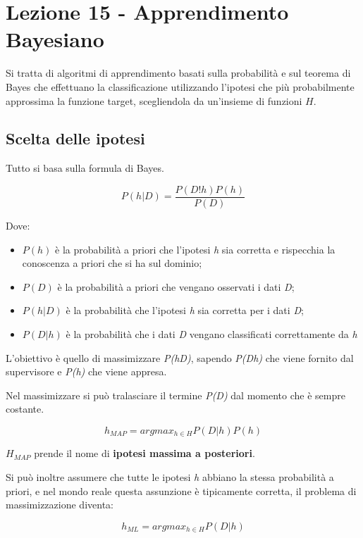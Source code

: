 \section{Lezione 15 - Apprendimento Bayesiano}\label{lezione-15---apprendimento-bayesiano}

Si tratta di algoritmi di apprendimento basati sulla probabilità e sul
teorema di Bayes che effettuano la classificazione utilizzando l'ipotesi che
più probabilmente approssima la funzione target, scegliendola da un'insieme di funzioni $H$.

\subsection{Scelta delle ipotesi}\label{scelta-delle-ipotesi}

Tutto si basa sulla formula di Bayes.

$$
P(h | D) = \frac{P(D!h)P(h)}{P(D)}
$$

Dove:

\begin{itemize}
\item $P(h)$ è la probabilità a priori che l'ipotesi \textit{h} sia corretta e rispecchia la conoscenza a priori che si ha sul dominio;
\item $P(D)$ è la probabilità a priori che vengano osservati i dati \textit{D};
\item $P(h|D)$ è la probabilità che l'ipotesi \textit{h} sia corretta per i dati \textit{D};
\item $P(D|h)$ è la probabilità che i dati \textit{D} vengano classificati correttamente da \textit{h} \end{itemize}

L'obiettivo è quello di massimizzare \emph{P(h\textbar{}D)}, sapendo
\emph{P(D\textbar{}h)} che viene fornito dal supervisore e \emph{P(h)}
che viene appresa.

Nel massimizzare si può tralasciare il termine \emph{P(D)} dal momento
che è sempre costante.

$$
h_{MAP} = argmax_{h \in H} P(D|h)P(h)
$$

$H_{MAP}$ prende il nome di \textbf{ipotesi massima a posteriori}.

Si può inoltre assumere che tutte le ipotesi \emph{h} abbiano la stessa probabilità a priori, e nel mondo reale questa assunzione è tipicamente corretta, il
problema di massimizzazione diventa:

$$
h_{ML} = argmax_{h \in H} P(D|h)
$$

